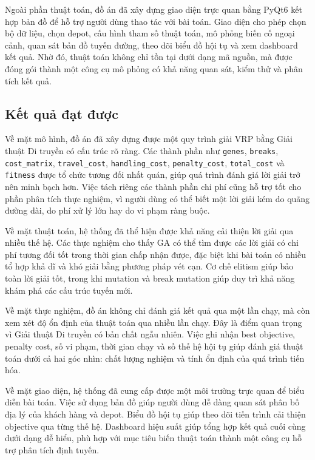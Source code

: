 \documentclass[12pt,a4paper]{article}
\numberwithin{figure}{subsection}
\begin{document}
Ngoài phần thuật toán, đồ án đã xây dựng giao diện trực quan bằng PyQt6 kết hợp bản đồ để hỗ trợ người dùng thao tác với bài toán. Giao diện cho phép chọn bộ dữ liệu, chọn depot, cấu hình tham số thuật toán, mô phỏng biến cố ngoại cảnh, quan sát bản đồ tuyến đường, theo dõi biểu đồ hội tụ và xem dashboard kết quả. Nhờ đó, thuật toán không chỉ tồn tại dưới dạng mã nguồn, mà được đóng gói thành một công cụ mô phỏng có khả năng quan sát, kiểm thử và phân tích kết quả.

\subsection{Kết quả đạt được}

Về mặt mô hình, đồ án đã xây dựng được một quy trình giải VRP bằng Giải thuật Di truyền có cấu trúc rõ ràng. Các thành phần như \texttt{genes}, \texttt{breaks}, \texttt{cost\_matrix}, \texttt{travel\_cost}, \texttt{handling\_cost}, \texttt{penalty\_cost}, \texttt{total\_cost} và \texttt{fitness} được tổ chức tương đối nhất quán, giúp quá trình đánh giá lời giải trở nên minh bạch hơn. Việc tách riêng các thành phần chi phí cũng hỗ trợ tốt cho phần phân tích thực nghiệm, vì người dùng có thể biết một lời giải kém do quãng đường dài, do phí xử lý lớn hay do vi phạm ràng buộc.

Về mặt thuật toán, hệ thống đã thể hiện được khả năng cải thiện lời giải qua nhiều thế hệ. Các thực nghiệm cho thấy GA có thể tìm được các lời giải có chi phí tương đối tốt trong thời gian chấp nhận được, đặc biệt khi bài toán có nhiều tổ hợp khả dĩ và khó giải bằng phương pháp vét cạn. Cơ chế elitism giúp bảo toàn lời giải tốt, trong khi mutation và break mutation giúp duy trì khả năng khám phá các cấu trúc tuyến mới.

Về mặt thực nghiệm, đồ án không chỉ đánh giá kết quả qua một lần chạy, mà còn xem xét độ ổn định của thuật toán qua nhiều lần chạy. Đây là điểm quan trọng vì Giải thuật Di truyền có bản chất ngẫu nhiên. Việc ghi nhận best objective, penalty cost, số vi phạm, thời gian chạy và số thế hệ hội tụ giúp đánh giá thuật toán dưới cả hai góc nhìn: chất lượng nghiệm và tính ổn định của quá trình tiến hóa.

Về mặt giao diện, hệ thống đã cung cấp được một môi trường trực quan để biểu diễn bài toán. Việc sử dụng bản đồ giúp người dùng dễ dàng quan sát phân bố địa lý của khách hàng và depot. Biểu đồ hội tụ giúp theo dõi tiến trình cải thiện objective qua từng thế hệ. Dashboard hiệu suất giúp tổng hợp kết quả cuối cùng dưới dạng dễ hiểu, phù hợp với mục tiêu biến thuật toán thành một công cụ hỗ trợ phân tích định tuyến.
\end{document}
